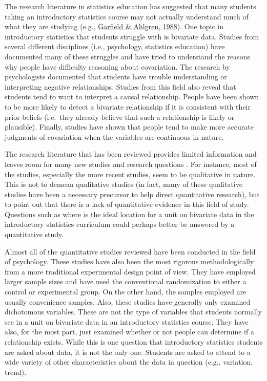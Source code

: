 \documentclass[11pt]{umnthesis}
\begin{document}
The research literature in statistics education has suggested that many students taking an introductory statistics course may not actually understand much of what they are studying (e.g., \protect\hyperlink{ref-garfield:1988}{Garfield \& Ahlgren, 1988}). One topic in introductory statistics that students struggle with is bivariate data. Studies from several different disciplines (i.e., psychology, statistics education) have documented many of these struggles and have tried to understand the reasons why people have difficulty reasoning about covariation. The research by psychologists documented that students have trouble understanding or interpreting negative relationships. Studies from this field also reveal that students tend to want to interpret a causal relationship. People have been shown to be more likely to detect a bivariate relationship if it is consistent with their prior beliefs (i.e.~they already believe that such a relationship is likely or plausible). Finally, studies have shown that people tend to make more accurate judgments of covariation when the variables are continuous in nature.

The research literature that has been reviewed provides limited information and leaves room for many new studies and research questions . For instance, most of the studies, especially the more recent studies, seem to be qualitative in nature. This is not to demean qualitative studies (in fact, many of these qualitative studies have been a necessary precursor to help direct quantitative research), but to point out that there is a lack of quantitative evidence in this field of study. Questions such as where is the ideal location for a unit on bivariate data in the introductory statistics curriculum could perhaps better be answered by a quantitative study.

Almost all of the quantitative studies reviewed have been conducted in the field of psychology. These studies have also been the most rigorous methodologically from a more traditional experimental design point of view. They have employed larger sample sizes and have used the conventional randomization to either a control or experimental group. On the other hand, the samples employed are usually convenience samples. Also, these studies have generally only examined dichotomous variables. These are not the type of variables that students normally see in a unit on bivariate data in an introductory statistics course. They have also, for the most part, just examined whether or not people can determine if a relationship exists. While this is one question that introductory statistics students are asked about data, it is not the only one. Students are asked to attend to a wide variety of other characteristics about the data in question (e.g., variation, trend).
\end{document}
